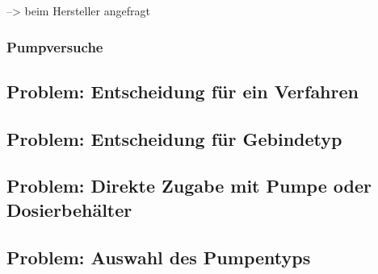 --> beim Hersteller angefragt

\subsubsection{Pumpversuche}



\subsection{Problem: Entscheidung für ein Verfahren}

\subsection{Problem: Entscheidung für Gebindetyp}

\subsection{Problem: Direkte Zugabe mit Pumpe oder Dosierbehälter}

\subsection{Problem: Auswahl des Pumpentyps}


